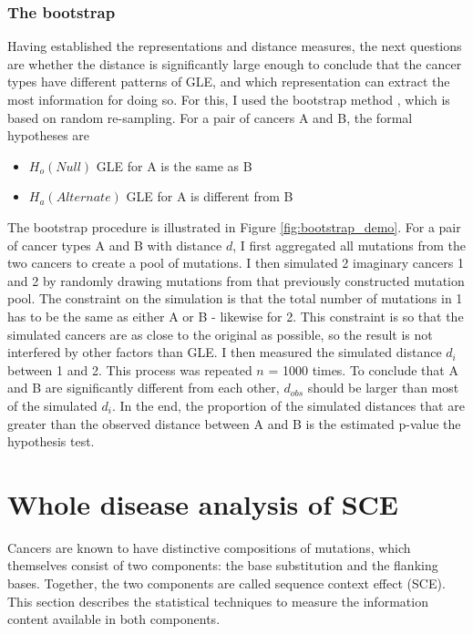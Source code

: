 

\subsubsection{The bootstrap}

Having established the representations and distance measures, the next questions are whether the distance is significantly large enough to conclude that the cancer types have different patterns of GLE, and which representation can extract the most information for doing so. For this, I used the bootstrap method \citep{Singh2010BootstrapMethod}, which is based on random re-sampling. For a pair of cancers A and B, the formal hypotheses are

\begin{itemize}
    \item $H_o (Null)$ GLE for A is the same as B
    \item $H_a (Alternate)$ GLE for A is different from B
\end{itemize}

The bootstrap procedure is illustrated in Figure \ref{fig:bootstrap_demo}. For a pair of cancer types A and B with distance $d$, I first aggregated all mutations from the two cancers to create a pool of mutations. I then simulated 2 imaginary cancers 1 and 2 by randomly drawing mutations from that previously constructed mutation pool. The constraint on the simulation is that the total number of mutations in 1 has to be the same as either A or B - likewise for 2. This constraint is so that the simulated cancers are as close to the original as possible, so the result is not interfered by other factors than GLE. I then measured the simulated distance $d_i$ between 1 and 2. This process was repeated $n$ = 1000 times. To conclude that A and B are significantly different from each other, $d_{obs}$ should be larger than most of the simulated $d_i$. In the end, the proportion of the simulated distances that are greater than the observed distance between A and B is the estimated p-value the hypothesis test. 



\section{Whole disease analysis of SCE}\label{methods:sce}
Cancers are known to have distinctive compositions of mutations, which themselves consist of two components: the base substitution and the flanking bases. Together, the two components are called sequence context effect (SCE). This section describes the statistical techniques  to measure the information content available in both components.

